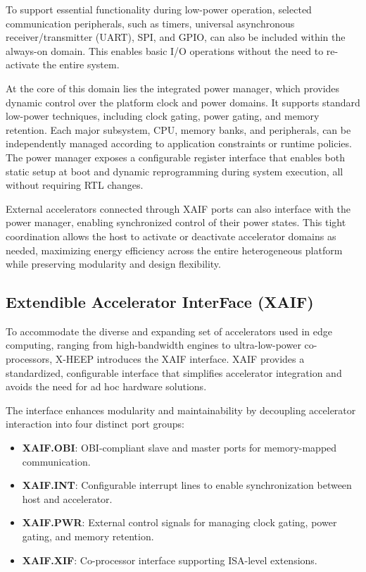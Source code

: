                 To support essential functionality during low-power operation, selected communication peripherals, such as timers, universal asynchronous receiver/transmitter (UART), SPI, and GPIO, can also be included within the always-on domain. This enables basic I/O operations without the need to re-activate the entire system.
                
                At the core of this domain lies the integrated power manager, which provides dynamic control over the platform clock and power domains. It supports standard low-power techniques, including clock gating, power gating, and memory retention. Each major subsystem, CPU, memory banks, and peripherals, can be independently managed according to application constraints or runtime policies. The power manager exposes a configurable register interface that enables both static setup at boot and dynamic reprogramming during system execution, all without requiring RTL changes.
                
                External accelerators connected through XAIF ports can also interface with the power manager, enabling synchronized control of their power states. This tight coordination allows the host to activate or deactivate accelerator domains as needed, maximizing energy efficiency across the entire heterogeneous platform while preserving modularity and design flexibility.

        \subsection{Extendible Accelerator InterFace (XAIF)}
        
            To accommodate the diverse and expanding set of accelerators used in edge computing, ranging from high-bandwidth engines to ultra-low-power co-processors, \mbox{X-HEEP} introduces the XAIF interface. XAIF provides a standardized, configurable interface that simplifies accelerator integration and avoids the need for ad hoc hardware solutions.
            
            The interface enhances modularity and maintainability by decoupling accelerator interaction into four distinct port groups:

            \vspace{-1em}
            \begin{itemize}
                \item \textbf{XAIF.OBI}: OBI-compliant slave and master ports for memory-mapped communication.
                \item \textbf{XAIF.INT}: Configurable interrupt lines to enable synchronization between host and accelerator.
                \item \textbf{XAIF.PWR}: External control signals for managing clock gating, power gating, and memory retention.
                \item \textbf{XAIF.XIF}: Co-processor interface supporting ISA-level extensions.
            \end{itemize}
            \vspace{-1em}
            
